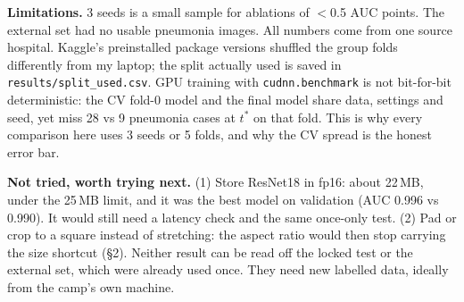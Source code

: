 \documentclass[10pt,a4paper]{article}
\begin{document}
\textbf{Limitations.} 3 seeds is a small sample for ablations of $<$0.5 AUC points. The external set had no usable pneumonia images. All numbers come from one source hospital.
Kaggle's preinstalled package versions shuffled the group folds differently from my laptop; the split actually used is saved in \texttt{results/split\_used.csv}. GPU training with \texttt{cudnn.benchmark} is not bit-for-bit
deterministic: the CV fold-0 model and the final model share data, settings and seed, yet miss 28 vs 9 pneumonia cases at $t^\ast$ on that fold.
This is why every comparison here uses 3 seeds or 5 folds, and why the CV spread is the honest error bar.

\textbf{Not tried, worth trying next.} (1) Store ResNet18 in fp16: about 22\,MB, under the 25\,MB limit, and it was the best model on validation (AUC 0.996 vs 0.990).
It would still need a latency check and the same once-only test. (2) Pad or crop to a square instead of stretching: the aspect ratio would then
stop carrying the size shortcut (\S2). Neither result can be read off the locked test or the external set, which were already used once.
They need new labelled data, ideally from the camp's own machine.
\end{document}
